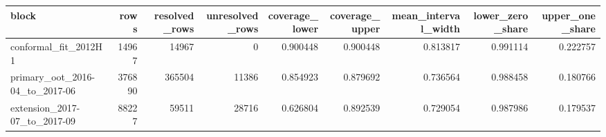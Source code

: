 \begin{tabular}{lrrrrrrrr}
\toprule
block & rows & resolved\_rows & unresolved\_rows & coverage\_lower & coverage\_upper & mean\_interval\_width & lower\_zero\_share & upper\_one\_share \\
\midrule
conformal\_fit\_2012H1 & 14967 & 14967 & 0 & 0.900448 & 0.900448 & 0.813817 & 0.991114 & 0.222757 \\
primary\_oot\_2016-04\_to\_2017-06 & 376890 & 365504 & 11386 & 0.854923 & 0.879692 & 0.736564 & 0.988458 & 0.180766 \\
extension\_2017-07\_to\_2017-09 & 88227 & 59511 & 28716 & 0.626804 & 0.892539 & 0.729054 & 0.987986 & 0.179537 \\
\bottomrule
\end{tabular}
